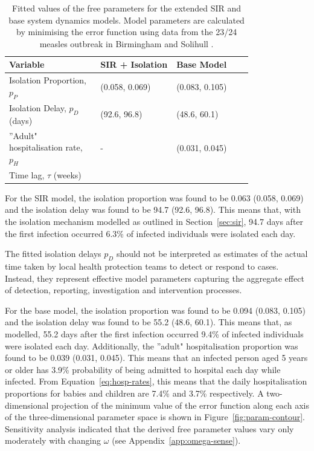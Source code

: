 \documentclass[12pt]{article}
\begin{document}
\begin{table}[ht!]
\centering
\begin{tabular}{
    p{0.3\linewidth} |
    >{\centering\arraybackslash}p{0.25\linewidth} |
    >{\centering\arraybackslash}p{0.25\linewidth}
}
    \toprule
    \textbf{Variable} & \textbf{SIR + Isolation} & \textbf{Base Model}\\ \midrule
    Isolation Proportion, $p_P$ & 0.063 (0.058, 0.069) & 0.094 (0.083, 0.105) \\
    Isolation Delay, $p_D$ (days)& 94.7 (92.6, 96.8) & 55.2 (48.6, 60.1) \\
    ''Adult" hospitalisation rate, $p_H$ & - & 0.039 (0.031, 0.045) \\
    Time lag, $\tau$ (weeks) & -2  & 3 \\
    \bottomrule
    \end{tabular}
    \caption{Fitted values of the free parameters for the extended SIR and base system dynamics models. Model parameters are calculated by minimising the error function using data from the 23/24 measles outbreak in Birmingham and Solihull \cite{jary2025sociodemographic, BSolICBWarehouse2026}.}
    \label{tab:tuned-params}
\end{table}

For the SIR model, the isolation proportion was found to be 0.063 (0.058, 0.069) and the isolation delay was found to be 94.7 (92.6, 96.8). This means that, with the isolation mechanism modelled as outlined in Section~\ref{sec:sir}, 94.7 days after the first infection occurred 6.3\% of infected individuals were isolated each day. 

The fitted isolation delays $p_D$ should not be interpreted as estimates of the actual time taken by local health protection teams to detect or respond to cases. Instead, they represent effective model parameters capturing the aggregate effect of detection, reporting, investigation and intervention processes.

For the base model, the isolation proportion was found to be 0.094 (0.083, 0.105) and the isolation delay was found to be 55.2 (48.6, 60.1). This means that, as modelled, 55.2 days after the first infection occurred 9.4\% of infected individuals were isolated each day. Additionally, the ''adult" hospitalisation proportion was found to be 0.039 (0.031, 0.045). This means that an infected person aged 5 years or older has 3.9\% probability of being admitted to hospital each day while infected. From Equation~\ref{eq:hosp-rates}, this means that the daily hospitalisation proportions for babies and children are 7.4\% and 3.7\% respectively. A two-dimensional projection of the minimum value of the error function along each axis of the three-dimensional parameter space is shown in Figure~\ref{fig:param-contour}. Sensitivity analysis indicated that the derived free parameter values vary only moderately with changing $\omega$ (see Appendix~\ref{app:omega-sense}). 
\end{document}

